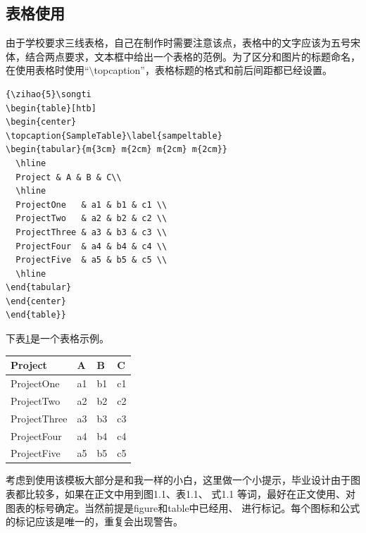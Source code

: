 {\begin{spacing}{1.5}
\section{表格使用}
由于学校要求三线表格，自己在制作时需要注意该点，表格中的文字应该为五号宋体，结合两点要求，文本框中给出一个表格的范例。为了区分和图片的标题命名，在使用表格时使用“$\setminus$topcaption”，表格标题的格式和前后间距都已经设置。

\newpage
\vspace{-4ex}
\begin{lstlisting}
{\zihao{5}\songti
\begin{table}[htb]
\begin{center}
\topcaption{SampleTable}\label{sampeltable}
\begin{tabular}{m{3cm} m{2cm} m{2cm} m{2cm}}
  \hline
  Project & A & B & C\\
  \hline
  ProjectOne   & a1 & b1 & c1 \\
  ProjectTwo   & a2 & b2 & c2 \\
  ProjectThree & a3 & b3 & c3 \\
  ProjectFour  & a4 & b4 & c4 \\
  ProjectFive  & a5 & b5 & c5 \\
  \hline
\end{tabular}
\end{center}
\end{table}}
\end{lstlisting}
\vspace{-2ex}

下表\ref{sampeltable}是一个表格示例。

{\wuhao\songti
\begin{table}[htb]
\begin{center}
\label{sampeltable}
\begin{tabular}{m{3cm} m{2cm} m{2cm} m{2cm}}
  \hline
  Project & A & B & C\\
  \hline
  ProjectOne& a1 & b1 & c1 \\
  ProjectTwo & a2 & b2 & c2 \\
  ProjectThree & a3 & b3 & c3 \\
  ProjectFour& a4 & b4 & c4 \\
  ProjectFive & a5& b5 & c5 \\
  \hline
\end{tabular}
\end{center}
\end{table}}

考虑到使用该模板大部分是和我一样的小白，这里做一个小提示，毕业设计由于图表都比较多，如果在正文中用到图1.1、表1.1、 式1.1 等词，最好在正文使用、对图表的标号确定。当然前提是figure和table中已经用、 进行标记。每个图标和公式的标记应该是唯一的，重复会出现警告。


\end{spacing}}
